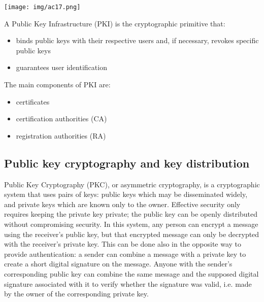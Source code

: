\documentclass[a4paper, 10pt, titlepage]{article}
\begin{document}
\begin{center}
\texttt{[image: img/ac17.png]}
\end{center}
A Public Key Infrastructure (PKI) is the cryptographic primitive that:
\begin{itemize}
\item binds public keys with their respective users and, if necessary, revokes specific public keys
\item guarantees user identification
\end{itemize}
The main components of PKI are:
\begin{itemize}
\item certificates
\item certification authorities (CA)
\item registration authorities (RA)
\end{itemize}

\subsection{Public key cryptography and key distribution}
Public Key Cryptography (PKC), or asymmetric cryptography, is a cryptographic system that uses pairs of keys: public keys which may be disseminated widely, and private keys which are known only to the owner. Effective security only requires keeping the private key private; the public key can be openly distributed without compromising security.
In this system, any person can encrypt a message using the receiver's public key, but that encrypted message can only be decrypted with the receiver's private key. This can be done also in the opposite way to provide authentication: a sender can combine a message with a private key to create a short digital signature on the message. Anyone with the sender's corresponding public key can combine the same message and the supposed digital signature associated with it to verify whether the signature was valid, i.e. made by the owner of the corresponding private key. 
\end{document}
